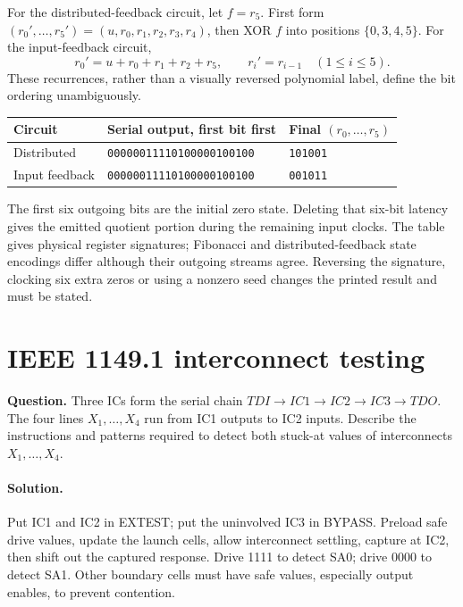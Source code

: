 \documentclass[11pt]{article}
\newcommand{\sol}{\paragraph{Solution.}}
\begin{document}
For the distributed-feedback circuit, let $f=r_5$.
First form $(r_0',\ldots,r_5')=(u,r_0,r_1,r_2,r_3,r_4)$,
then XOR $f$ into positions $\{0,3,4,5\}$.
For the input-feedback circuit,
\[
r_0'=u+r_0+r_1+r_2+r_5,\qquad r_i'=r_{i-1}\quad(1\le i\le5).
\]
These recurrences, rather than a visually reversed polynomial label, define
the bit ordering unambiguously.
\begin{center}\begin{tabular}{lll}\toprule
Circuit & Serial output, first bit first & Final $(r_0,\ldots,r_5)$\\\midrule
Distributed & \texttt{00000011110100000100100} & \texttt{101001}\\
Input feedback & \texttt{00000011110100000100100} & \texttt{001011}\\
\bottomrule\end{tabular}\end{center}
The first six outgoing bits are the initial zero state.
Deleting that six-bit latency gives the emitted quotient portion during the
remaining input clocks. The table gives physical register signatures;
Fibonacci and distributed-feedback state encodings differ although their
outgoing streams agree. Reversing the signature, clocking six extra zeros or
using a nonzero seed changes the printed result and must be stated.

\section{IEEE 1149.1 interconnect testing}
\textbf{Question.} Three ICs form the serial chain
$TDI\to IC1\to IC2\to IC3\to TDO$.
The four lines $X_1,\ldots,X_4$ run from IC1 outputs to IC2 inputs.
Describe the instructions and patterns required to detect
both stuck-at values of interconnects $X_1,\ldots,X_4$.\begin{center}\end{center}

\sol Put IC1 and IC2 in EXTEST; put the uninvolved IC3 in BYPASS.
Preload safe drive values, update the launch cells, allow interconnect settling,
capture at IC2, then shift out the captured response. Drive 1111 to detect SA0;
drive 0000 to detect SA1. Other boundary cells must have safe values, especially
output enables, to prevent contention.
\end{document}
